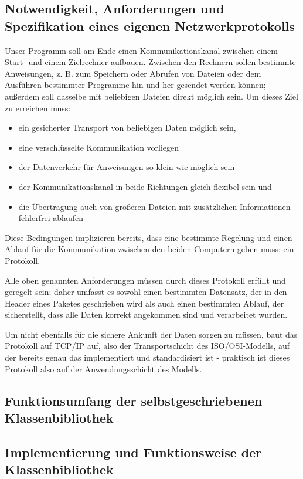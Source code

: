 \documentclass[12pt, a4paper]{scrartcl}
\begin{document}
\subsection{Notwendigkeit, Anforderungen und Spezifikation eines eigenen Netzwerkprotokolls}
Unser Programm soll am Ende einen Kommunikationskanal zwischen einem Start- und einem Zielrechner aufbauen. 
Zwischen den Rechnern sollen bestimmte Anweisungen, z. B. zum Speichern oder Abrufen von Dateien oder dem Ausführen bestimmter Programme hin und her gesendet werden können; außerdem soll dasselbe mit beliebigen Dateien direkt möglich sein.
Um dieses Ziel zu erreichen muss:
\begin{itemize}
\item ein gesicherter Transport von beliebigen Daten möglich sein,
\item eine verschlüsselte Kommunikation vorliegen
\item der Datenverkehr für Anweisungen so klein wie möglich sein
\item der Kommunikationskanal in beide Richtungen gleich flexibel sein und
\item die Übertragung auch von größeren Dateien mit zusätzlichen Informationen fehlerfrei ablaufen
\end{itemize}
Diese Bedingungen implizieren bereits, dass eine bestimmte Regelung und einen Ablauf für die Kommunikation zwischen den beiden Computern geben muss: ein Protokoll.\par
Alle oben genannten Anforderungen müssen durch dieses Protokoll erfüllt und geregelt sein; daher umfasst es sowohl einen bestimmten Datensatz, der in den Header eines Paketes geschrieben wird als auch einen bestimmten Ablauf, der sicherstellt, dass alle Daten korrekt angekommen sind und verarbeitet wurden.\par 
Um nicht ebenfalls für die sichere Ankunft der Daten sorgen zu müssen, baut das Protokoll auf TCP/IP auf, also der Transportschicht des ISO/OSI-Modells, auf der bereits genau das implementiert und standardisiert ist - praktisch ist dieses Protokoll also auf der Anwendungsschicht des Modells.

\subsection{Funktionsumfang der selbstgeschriebenen Klassenbibliothek}
\subsection{Implementierung und Funktionsweise der Klassenbibliothek}
\end{document}
